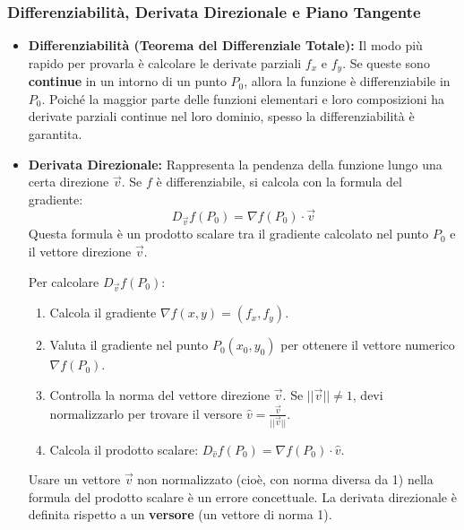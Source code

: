 \documentclass[a4paper, 12pt]{article}
\begin{document}

\subsubsection{Differenziabilità, Derivata Direzionale e Piano Tangente}
\begin{itemize}
    \item \textbf{Differenziabilità (Teorema del Differenziale Totale):} Il modo più rapido per provarla è calcolare le derivate parziali $f_x$ e $f_y$. Se queste sono \textbf{continue} in un intorno di un punto $P_0$, allora la funzione è differenziabile in $P_0$.  Poiché la maggior parte delle funzioni elementari e loro composizioni ha derivate parziali continue nel loro dominio, spesso la differenziabilità è garantita. 
    
    \item \textbf{Derivata Direzionale:} Rappresenta la pendenza della funzione lungo una certa direzione $\vec{v}$. Se $f$ è differenziabile, si calcola con la formula del gradiente: 
    \[ D_{\vec{v}}f(P_0) = \nabla f(P_0) \cdot \vec{v} \]
    Questa formula è un prodotto scalare tra il gradiente calcolato nel punto $P_0$ e il vettore direzione $\vec{v}$. 
    \begin{strategia}
    Per calcolare $D_{\vec{v}}f(P_0)$:
    \begin{enumerate}
        \item Calcola il gradiente $\nabla f(x,y) = (f_x, f_y)$.
        \item Valuta il gradiente nel punto $P_0(x_0, y_0)$ per ottenere il vettore numerico $\nabla f(P_0)$.
        \item Controlla la norma del vettore direzione $\vec{v}$. Se $||\vec{v}|| \neq 1$, devi normalizzarlo per trovare il versore $\hat{v} = \frac{\vec{v}}{||\vec{v}||}$. 
        \item Calcola il prodotto scalare: $D_{\hat{v}}f(P_0) = \nabla f(P_0) \cdot \hat{v}$.
    \end{enumerate}
    \end{strategia}
    \begin{errore}
    Usare un vettore $\vec{v}$ non normalizzato (cioè, con norma diversa da 1) nella formula del prodotto scalare è un errore concettuale. La derivata direzionale è definita rispetto a un \textbf{versore} (un vettore di norma 1). 
    \end{errore}
    

\end{itemize}
\end{document}
